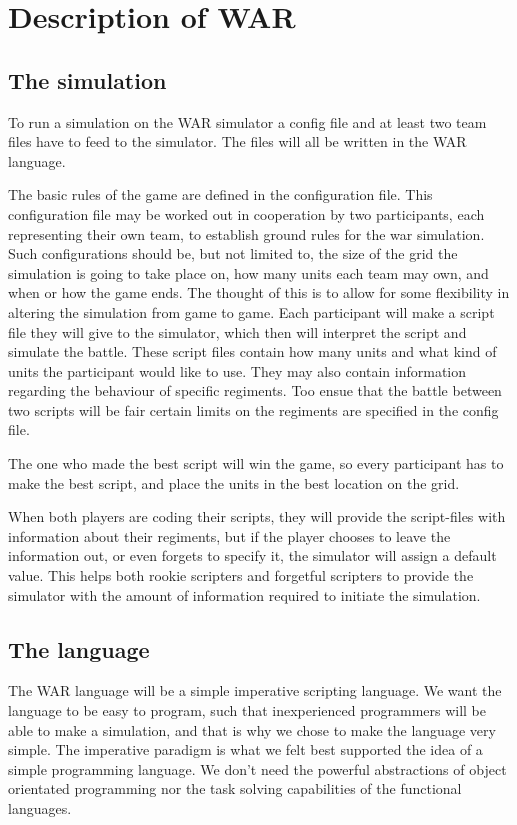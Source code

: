 
\section{ Description of WAR }

	\subsection{The simulation}
		To run a simulation on the WAR simulator a config file and at least two team files have to feed to the simulator. 
		The files will all be written in the WAR language.
		
		The basic rules of the game are defined in the configuration file. 
		This configuration file may be worked out in cooperation by two participants, each representing their own team, 
		to establish ground rules for the war simulation. Such configurations should be, but not limited to, 
		the size of the grid the simulation is going to take place on, how many units each team may own, and when or how the game ends.
		The thought of this is to allow for some flexibility in altering the simulation from game to game.
		Each participant will make a script file they will give to the simulator, 
		which then will interpret the script and simulate the battle. 
		These script files contain how many units and what kind of units the participant would like to use. 
		They may also contain information regarding the behaviour of specific regiments. 
		Too ensue that the battle between two scripts will be fair certain limits on the regiments are specified in the config file.
	
		The one who made the best script will win the game, so every participant has to make the best script, 
		and place the units in the best location on the grid.
	
		When both players are coding their scripts, they will provide the script-files with information about their regiments, 
		but if the player chooses to leave the information out, or even forgets to specify it, 
		the simulator will assign a default value. 
		This helps both rookie scripters and forgetful scripters to provide the simulator 
		with the amount of information required to initiate the simulation.

	\subsection{The language}
		The WAR language will be a simple imperative scripting language. 
		We want the language to be easy to program, such that inexperienced programmers will be able to make a simulation, and that is why we chose to
		make the language very simple. The imperative paradigm is what we felt best supported the idea of a simple programming language. We don't need the
		powerful abstractions of object orientated programming nor the task solving capabilities of the functional languages.
		
		 
		